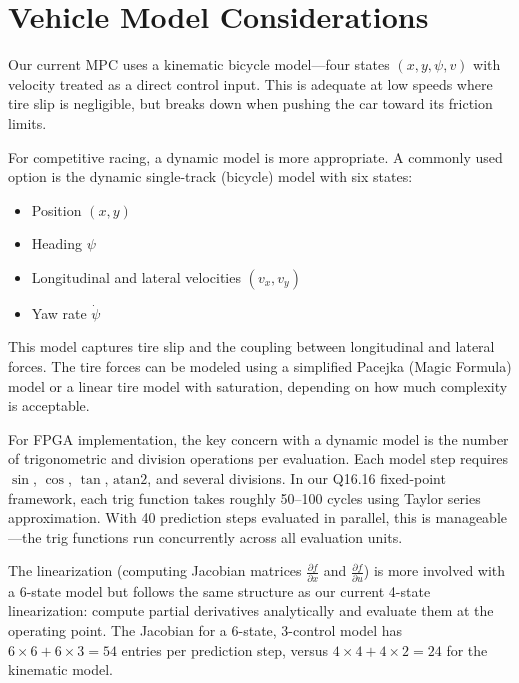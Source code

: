 \documentclass[12pt,a4paper]{article}
\begin{document}
\section{Vehicle Model Considerations}

Our current MPC uses a kinematic bicycle model---four states $(x, y, \psi, v)$ with velocity treated as a direct control input. This is adequate at low speeds where tire slip is negligible, but breaks down when pushing the car toward its friction limits.

For competitive racing, a dynamic model is more appropriate. A commonly used option is the dynamic single-track (bicycle) model with six states:

\begin{itemize}
    \item Position $(x, y)$
    \item Heading $\psi$
    \item Longitudinal and lateral velocities $(v_x, v_y)$
    \item Yaw rate $\dot{\psi}$
\end{itemize}

This model captures tire slip and the coupling between longitudinal and lateral forces. The tire forces can be modeled using a simplified Pacejka (Magic Formula) model or a linear tire model with saturation, depending on how much complexity is acceptable.

For FPGA implementation, the key concern with a dynamic model is the number of trigonometric and division operations per evaluation. Each model step requires $\sin$, $\cos$, $\tan$, $\text{atan2}$, and several divisions. In our Q16.16 fixed-point framework, each trig function takes roughly 50--100 cycles using Taylor series approximation. With 40 prediction steps evaluated in parallel, this is manageable---the trig functions run concurrently across all evaluation units.

The linearization (computing Jacobian matrices $\frac{\partial f}{\partial x}$ and $\frac{\partial f}{\partial u}$) is more involved with a 6-state model but follows the same structure as our current 4-state linearization: compute partial derivatives analytically and evaluate them at the operating point. The Jacobian for a 6-state, 3-control model has $6 \times 6 + 6 \times 3 = 54$ entries per prediction step, versus $4 \times 4 + 4 \times 2 = 24$ for the kinematic model.
\end{document}
